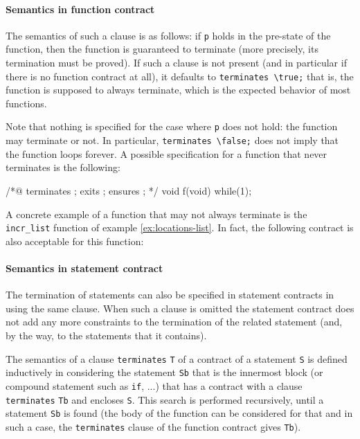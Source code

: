 \paragraph{Semantics in function contract}
The semantics of such a clause is as follows: if \lstinline|p| holds in the
pre-state of the function, then the function is guaranteed to terminate (more
precisely, its termination must be proved). If such a clause is not present (and
in particular if there is no function contract at all), it
defaults to \lstinline|terminates \true;| that is, the function is supposed
to always terminate, which is the expected behavior of most
functions.

Note that nothing is specified for the case where \lstinline|p| does not hold:
the function may terminate or not. In particular,
\lstinline|terminates \false;| does not imply that the function loops
forever. A possible specification for a function that never terminates
is the following:
\begin{listing}{1}
/*@
  terminates \false;
  exits \false;
  ensures \false;
*/
void f(void) { while(1); }
\end{listing}

\begin{example}
  A concrete example of a function that may not always terminate is
  the \lstinline|incr_list| function of example \ref{ex:locations-list}. In
  fact, the following contract is also acceptable for this function:
\end{example}

\paragraph{Semantics in statement contract}
The termination of statements can also be specified in statement contracts in using
the same clause.
When such a clause is omitted the statement contract does not add any more constraints
to the termination of the related statement (and, by the way, to the statements that it contains).

The semantics of a clause \lstinline|terminates| \lstinline|T| of a contract of
a statement \lstinline|S| is defined inductively in considering the
statement \lstinline|Sb| that is the innermost block (or compound statement such
as \lstinline|if|, ...) that has a contract with a clause \lstinline|terminates|
\lstinline|Tb| and encloses \lstinline|S|.
This search is performed recursively, until a statement \lstinline|Sb| is found
(the body of the function can be considered for that and in such a case, the
\lstinline|terminates| clause of the function contract gives \lstinline|Tb|).

